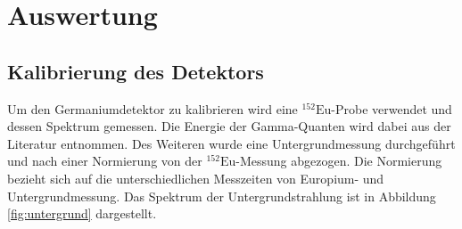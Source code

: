 \section{Auswertung}
\label{sec:Auswertung}

      


\subsection{Kalibrierung des Detektors}

Um den Germaniumdetektor zu kalibrieren wird eine $^{152}\text{Eu}$-Probe verwendet und dessen Spektrum gemessen.
Die Energie der Gamma-Quanten wird dabei aus der Literatur entnommen. 
Des Weiteren wurde eine Untergrundmessung durchgeführt und nach einer Normierung von der $^{152}\text{Eu}$-Messung abgezogen.
Die Normierung bezieht sich auf die unterschiedlichen Messzeiten von Europium- und Untergrundmessung.
Das Spektrum der Untergrundstrahlung ist in Abbildung \ref{fig:untergrund} dargestellt.


